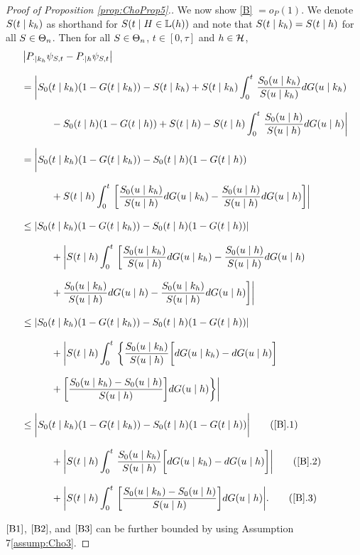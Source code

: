 \begin{proof}[Proof of Proposition \ref{prop:ChoProp5}.]
We now show \cref{B} $= o_P(1)$. We denote $S(t\mid k_h)$ as shorthand for $S(t\mid H \in \mathbb{L}(h))$ and note that $S(t\mid k_h) = S (t\mid h)$ for all $S \in \Theta_n$. Then for all $S \in \Theta_n$, $t \in [0, \tau]$ and $h \in \mathcal{H}$,
\begin{align*}
&\abs{\Pdotkh-\Pdot} \eqnspace
&=\bigg| \truesurv\argtgkh(1-G\argtgkh) -\survfunc\argtgkh + \survfunc\argtgkh \intzerotot \frac{\truesurv\argugkh
}{\survfunc\argugkh}dG\argugkh \eqnspace
&\quad\quad\quad -\truesurv\argtgh(1-G\argtgh) + \survfunc\argtgh - \survfunc\argtgh \intzerotot \frac{\truesurv\argugh}{\survfunc\argugh}dG\argugh\bigg| \eqnspace
&=\bigg| \truesurv\argtgkh(1-G\argtgkh) 
-\truesurv\argtgh(1-G\argtgh) \eqnspace
&\quad \quad \quad + \survfunc\argtgh \intzerotot \bigg[ \frac{\truesurv\argugkh
}{\survfunc\argugh}dG\argugkh -\frac{\truesurv\argugh}{\survfunc\argugh}dG\argugh \bigg] \bigg| \eqnspace
&\leq \abs{\truesurv\argtgkh(1-G\argtgkh) 
-\truesurv\argtgh(1-G\argtgh)}\eqnspace
&\quad \quad \quad + \bigg| \survfunc\argtgh \intzerotot \bigg[ \frac{\truesurv\argugkh
}{\survfunc\argugh}dG\argugkh -\frac{\truesurv\argugh}{\survfunc\argugh}dG\argugh \eqnspace
&\quad\quad\quad+ \frac{\truesurv\argugkh}{\survfunc\argugh}dG\argugh - \frac{\truesurv\argugkh}{\survfunc\argugh}dG\argugh 
\bigg] \bigg| \eqnspace
&\leq \abs{\truesurv\argtgkh(1-G\argtgkh) 
-\truesurv\argtgh(1-G\argtgh)}\eqnspace
&\quad \quad \quad + \bigg| \survfunc\argtgh \intzerotot \bigg\{ \frac{\truesurv\argugkh
}{\survfunc\argugh} 
\bigg[dG\argugkh -dG\argugh \bigg] \eqnspace
&\quad \quad \quad 
+ \bigg[ \frac{\truesurv\argugkh - \truesurv\argugh}{\survfunc\argugh} \bigg] dG\argugh
\bigg\} \bigg| \eqnspace
&\leq \bigg|\truesurv\argtgkh(1-G\argtgkh)
-\truesurv\argtgh(1-G\argtgh)\bigg| \label{B1}\tag{\ref{B}.1} \eqnspace
&\quad \quad \quad + \bigg| \survfunc\argtgh \intzerotot  \frac{\truesurv\argugkh
}{\survfunc\argugh} 
\bigg[dG\argugkh -dG\argugh \bigg] \bigg| \label{B2}\tag{\ref{B}.2}\eqnspace
&\quad \quad \quad + \bigg| \survfunc\argtgh \intzerotot \bigg[ \frac{\truesurv\argugkh - \truesurv\argugh}{\survfunc\argugh} \bigg] dG\argugh
\bigg|. \label{B3}\tag{\ref{B}.3}
\end{align*}

$\cref{B1}$, $\cref{B2}$, and $\cref{B3}$ can be further bounded by using Assumption \ifnum{} 7\else \ref{assump:Cho3}\fi.


\end{proof}
